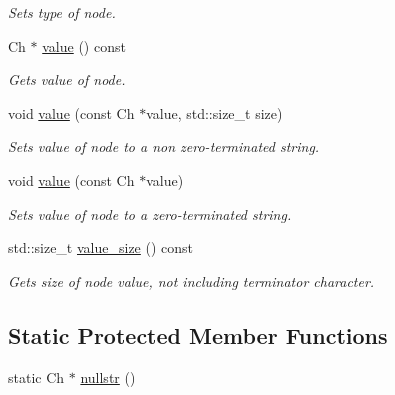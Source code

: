 \begin{DoxyCompactItemize}
\begin{DoxyCompactList}\small\item\em Sets type of node. \end{DoxyCompactList}\item 
Ch $\ast$ \mbox{\hyperlink{classrapidxml_1_1xml__base_a558b1045e6751e4024309d41bf35c542}{value}} () const
\begin{DoxyCompactList}\small\item\em Gets value of node. \end{DoxyCompactList}\item 
void \mbox{\hyperlink{classrapidxml_1_1xml__base_ad9640aa3f5374673cb72a5289b6c91eb}{value}} (const Ch $\ast$value, std\+::size\+\_\+t size)
\begin{DoxyCompactList}\small\item\em Sets value of node to a non zero-\/terminated string. \end{DoxyCompactList}\item 
void \mbox{\hyperlink{classrapidxml_1_1xml__base_a18c7469acdca771de9b4f3054053029c}{value}} (const Ch $\ast$value)
\begin{DoxyCompactList}\small\item\em Sets value of node to a zero-\/terminated string. \end{DoxyCompactList}\item 
std\+::size\+\_\+t \mbox{\hyperlink{classrapidxml_1_1xml__base_aa6981b3244607ea4ae7634f74f25361b}{value\+\_\+size}} () const
\begin{DoxyCompactList}\small\item\em Gets size of node value, not including terminator character. \end{DoxyCompactList}\end{DoxyCompactItemize}
\subsection*{Static Protected Member Functions}
\begin{DoxyCompactItemize}
\item 
static Ch $\ast$ \mbox{\hyperlink{classrapidxml_1_1xml__base_a641d0b8df8e0c3c7e0db06ced0e0749f}{nullstr}} ()
\end{DoxyCompactItemize}
